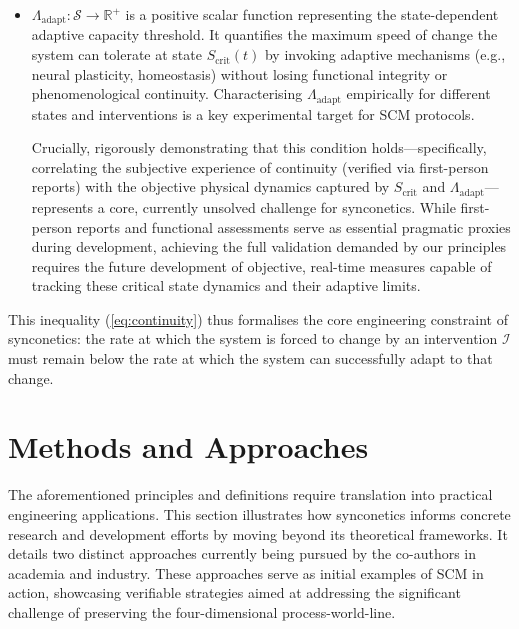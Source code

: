 \documentclass[10pt]{article}
\begin{document}
\begin{sloppypar}
\begin{itemize}
\begin{itemize}
            \item \( \Lambda_{\text{adapt}}: \mathcal{S} \to \mathbb{R}^+ \) is a positive scalar function representing the state-dependent adaptive capacity threshold. It quantifies the maximum speed of change the system can tolerate at state \( S_{\text{crit}}(t) \) by invoking adaptive mechanisms (e.g., neural plasticity, homeostasis) without losing functional integrity or phenomenological continuity. Characterising \( \Lambda_{\text{adapt}} \) empirically for different states and interventions is a key experimental target for SCM protocols.

                  Crucially, rigorously demonstrating that this condition holds—specifically, correlating the subjective experience of continuity (verified via first-person reports) with the objective physical dynamics captured by \(S_{\text{crit}}\) and \( \Lambda_{\text{adapt}} \)—represents a core, currently unsolved challenge for synconetics. While first-person reports and functional assessments serve as essential pragmatic proxies during development, achieving the full validation demanded by our principles requires the future development of objective, real-time measures capable of tracking these critical state dynamics and their adaptive limits.
          \end{itemize}

          This inequality (\autoref{eq:continuity}) thus formalises the core engineering constraint of synconetics: the rate at which the system is forced to change by an intervention \( \mathcal{I} \) must remain below the rate at which the system can successfully adapt to that change.
  \end{itemize}

  \section{Methods and Approaches}
  \label{sec:methods}

  The aforementioned principles and definitions require translation into practical engineering applications. This section illustrates how synconetics informs concrete research and development efforts by moving beyond its theoretical frameworks. It details two distinct approaches currently being pursued by the co-authors in academia and industry. These approaches serve as initial examples of SCM in action, showcasing verifiable strategies aimed at addressing the significant challenge of preserving the four-dimensional process-world-line.


\end{sloppypar}
\end{document}
